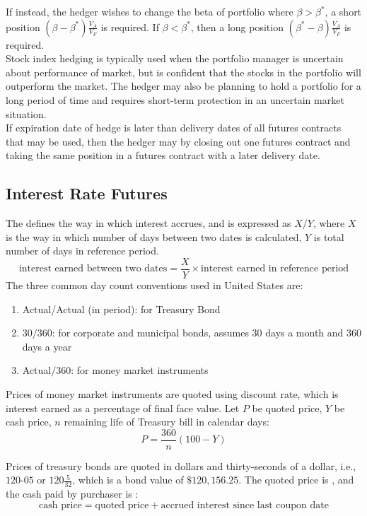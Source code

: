 If instead, the hedger wishes to change the beta of portfolio where $\beta > \beta^*$, a short position $(\beta - \beta^*)\frac{V_A}{V_F}$ is required. If $\beta < \beta^*$, then a long position $(\beta^* - \beta)\frac{V_A}{V_F}$ is required.\\

Stock index hedging is typically used when the portfolio manager is uncertain about performance of market, but is confident that the stocks in the portfolio will outperform the market. The hedger may also be planning to hold a portfolio for a long period of time and requires short-term protection in an uncertain market situation.\\

If expiration date of hedge is later than delivery dates of all futures contracts that may be used, then the hedger may  by closing out one futures contract and taking the same position in a futures contract with a later delivery date.

\subsection{Interest Rate Futures}

The  defines the way in which interest accrues, and is expressed as $X/Y$, where $X$ is the way in which number of days between two dates is calculated, $Y$ is total number of days in reference period.
\begin{equation*}
\text{interest earned between two dates} = \frac{X}{Y} \times \text{interest earned in reference period} \nonumber
\end{equation*}
The three common day count conventions used in United States are:
\begin{enumerate}[label=\roman*.]
\setlength{\itemsep}{0pt}
\item Actual/Actual (in period): for Treasury Bond
\item $30/360$: for corporate and municipal bonds, assumes $30$ days a month and $360$ days a year
\item Actual$/360$: for money market instruments
\end{enumerate}

Prices of money market instruments are quoted using discount rate, which is interest earned as a percentage of final face value. Let $P$ be quoted price, $Y$ be cash price, $n$ remaining life of Treasury bill in calendar days:
\begin{equation*}
P = \frac{360}{n}(100 - Y) \nonumber
\end{equation*}

Prices of treasury bonds are quoted in dollars and thirty-seconds of a dollar, i.e., $120$-$05$ or $120\frac{5}{32}$, which is a bond value of $\$120,156.25$. The quoted price is , and the cash paid by purchaser is :
\begin{equation*}
\text{cash price} = \text{quoted price} + \text{accrued interest since last coupon date} \nonumber
\end{equation*} 



